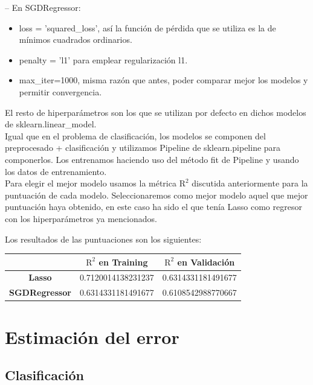\documentclass[12pt]{article}
\begin{document}
-- En SGDRegressor:
\begin{itemize}
		\item loss = 'squared\_loss', así la función de pérdida que se utiliza es la de mínimos cuadrados ordinarios.
        \item penalty = 'l1' para emplear regularización l1.
        \item max\_iter=1000, misma razón que antes, poder comparar mejor los modelos y permitir convergencia.
\end{itemize}

El resto de hiperparámetros son los que se utilizan por defecto en dichos modelos de sklearn.linear\_model. \\

Igual que en el problema de clasificación, los modelos se componen del preprocesado + clasificación y utilizamos Pipeline de sklearn.pipeline para componerlos. Los entrenamos haciendo uso del método fit de Pipeline y usando los datos de entrenamiento.\\

Para elegir el mejor modelo usamos la métrica $\text{R}^2$ discutida anteriormente para la puntuación de cada modelo. Seleccionaremos como mejor modelo aquel que mejor puntuación haya obtenido, en este caso ha sido el que tenía Lasso como regresor con los hiperparámetros ya mencionados.

Los resultados de las puntuaciones son los siguientes:

\begin{table}[H]
\centering
\begin{tabular}{c|c|c|}
\cline{2-3}
                                                      & \textbf{$\text{R}^2$ en Training} & \textbf{$\text{R}^2$ en Validación} \\ \hline
\multicolumn{1}{|c|}{\textbf{Lasso}} & 0.7120014138231237           & 0.6314331181491677             \\ \hline
\multicolumn{1}{|c|}{\textbf{SGDRegressor}}    & 0.6314331181491677                          & 0.6108542988770667             \\ \hline
\end{tabular}
\end{table}

\section{Estimación del error }

\subsection{Clasificación}
\end{document}
